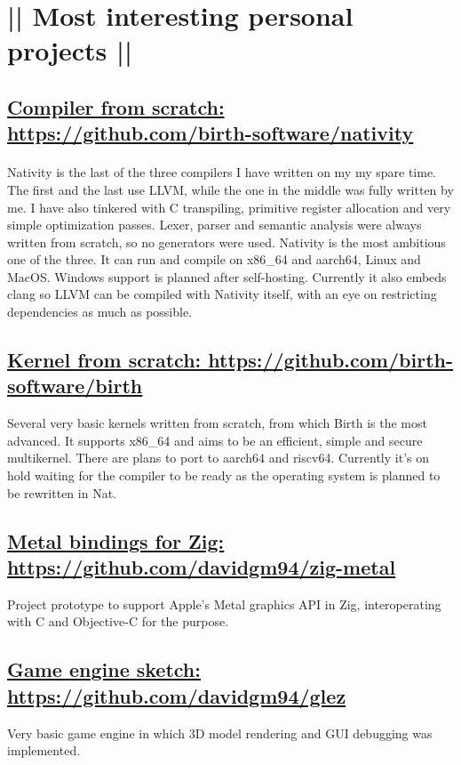 \section*{|| Most interesting personal projects ||}
	\subsection*{\underline{Compiler from scratch: \href{https://github.com/birth-software/nativity}{\textbf{https://github.com/birth-software/nativity}}}}
	
	\paragraph{}Nativity is the last of the three compilers I have written on my my spare time. The first and the last use LLVM, while the one in the middle was fully written by me. I have also tinkered with C transpiling, primitive register allocation and very simple optimization passes. Lexer, parser and semantic analysis were always written from scratch, so no generators were used. Nativity is the most ambitious one of the three. It can run and compile on x86\_64 and aarch64, Linux and MacOS. Windows support is planned after self-hosting. Currently it also embeds clang so LLVM can be compiled with Nativity itself, with an eye on restricting dependencies as much as possible.
	\subsection*{\underline{Kernel from scratch: \href{https://github.com/birth-software/birth}{https://github.com/birth-software/birth}}}
	Several very basic kernels written from scratch, from which Birth is the most advanced. It supports x86\_64 and aims to be an efficient, simple and secure multikernel. There are plans to port to aarch64 and riscv64. Currently it's on hold waiting for the compiler to be ready as the operating system is planned to be rewritten in Nat.
	
	\subsection*{\underline{Metal bindings for Zig: \href{https://github.com/davidgm94/zig-metal}{https://github.com/davidgm94/zig-metal}}}
	Project prototype to support Apple's Metal graphics API in Zig, interoperating with C and Objective-C for the purpose.

	\subsection*{\underline{Game engine sketch: \href{https://github.com/davidgm94/glez}{https://github.com/davidgm94/glez}}}
	Very basic game engine in which 3D model rendering and GUI debugging was implemented.